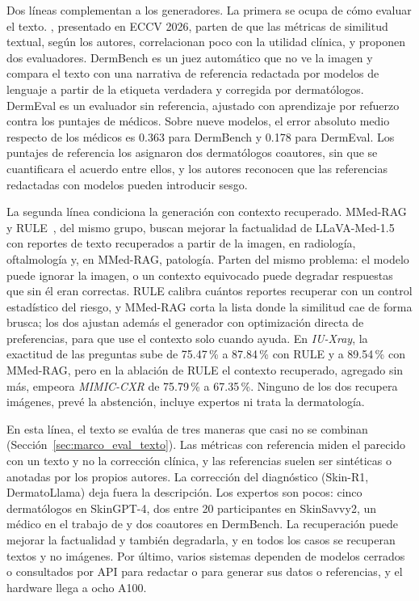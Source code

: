 Dos líneas complementan a los generadores. La primera se ocupa de cómo evaluar el texto.
\textcite{shen2025dermbench}, presentado en ECCV 2026, parten de que las métricas de similitud textual, según los
autores, correlacionan poco con la utilidad clínica, y proponen dos evaluadores. DermBench es un juez automático que
no ve la imagen y compara el texto con una narrativa de referencia redactada por modelos de lenguaje a partir de la
etiqueta verdadera y corregida por dermatólogos. DermEval es un evaluador sin referencia, ajustado con aprendizaje
por refuerzo contra los puntajes de médicos. Sobre nueve modelos, el error absoluto medio respecto de los médicos es
0.363 para DermBench y 0.178 para DermEval. Los puntajes de referencia los asignaron dos dermatólogos coautores, sin
que se cuantificara el acuerdo entre ellos, y los autores reconocen que las referencias redactadas con modelos pueden
introducir sesgo.

La segunda línea condiciona la generación con contexto recuperado. MMed-RAG~\cite{xia2025mmedrag} y
RULE~\cite{xia2024rule}, del mismo grupo, buscan mejorar la factualidad de LLaVA-Med-1.5 con reportes de texto
recuperados a partir de la imagen, en radiología, oftalmología y, en MMed-RAG, patología. Parten del mismo problema:
el modelo puede ignorar la imagen, o un contexto equivocado puede degradar respuestas que sin él eran correctas. RULE
calibra cuántos reportes recuperar con un control estadístico del riesgo, y MMed-RAG corta la lista donde la
similitud cae de forma brusca; los dos ajustan además el generador con optimización directa de preferencias, para que
use el contexto solo cuando ayuda. En \emph{IU-Xray}, la exactitud de las preguntas sube de 75.47\,\% a 87.84\,\%
con RULE y a 89.54\,\% con MMed-RAG, pero en la ablación de RULE el contexto recuperado, agregado sin más, empeora
\emph{MIMIC-CXR} de 75.79\,\% a 67.35\,\%. Ninguno de los dos recupera imágenes, prevé la abstención, incluye expertos ni
trata la dermatología.

En esta línea, el texto se evalúa de tres maneras que casi no se combinan (Sección~\ref{sec:marco_eval_texto}). Las
métricas con referencia miden el parecido con un texto y no la corrección clínica, y las referencias suelen ser
sintéticas o anotadas por los propios autores. La corrección del diagnóstico (Skin-R1, DermatoLlama) deja fuera la
descripción. Los expertos son pocos: cinco dermatólogos en SkinGPT-4, dos entre 20 participantes en SkinSavvy2, un
médico en el trabajo de \citeauthor{chakrabarti2025skin} y dos coautores en DermBench. La recuperación puede mejorar
la factualidad y también degradarla, y en todos los casos se recuperan textos y no imágenes. Por último, varios
sistemas dependen de modelos cerrados o consultados por API para redactar o para generar sus datos o referencias, y
el hardware llega a ocho A100.

